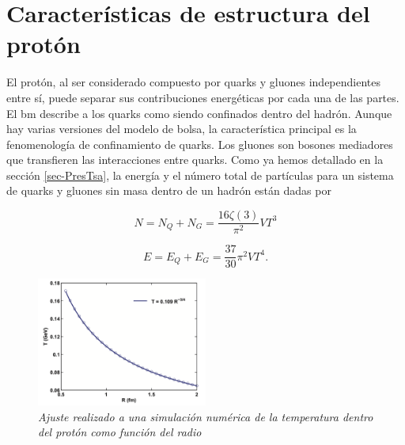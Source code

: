 \chapter{Características de estructura del protón}\label{ch-ProtonStructureCh}

\fancyhf{} %
\fancyhead[LE]{\nouppercase{\textbf{\leftmark}\hfill\textit{\rightmark}}}
\fancyhead[RO]{\nouppercase{\textit{\rightmark}\hfill\textbf{\leftmark}}}

El protón, al ser considerado compuesto por quarks y gluones independientes entre sí, puede separar sus contribuciones energéticas por cada una de las partes. El \acrshort{bm} describe a los quarks como siendo confinados dentro del hadrón. Aunque hay varias versiones del modelo de bolsa, la característica principal es la fenomenología de confinamiento de quarks. Los gluones son bosones mediadores que transfieren las interacciones entre quarks. Como ya hemos detallado en la sección \ref{sec-PresTsa}, la energía y el número total de partículas para un sistema de quarks y gluones sin masa dentro de un hadrón están dadas por

\begin{equation}
N ={N}_{Q} + {N}_{G}  = \frac{16 \zeta(3)}{{\pi}^{2}}V{T}^{3}
\end{equation}

\begin{equation}
E = {E}_{Q} + {E}_{G} = \frac{37}{30} {\pi}^{2} V{T}^{4}.
\end{equation}


\begin{figure}
\centering
\includegraphics[width=0.5\textwidth]{./Images/T(R).png}
\caption[Temperatura como función del radio del protón]{\emph{Ajuste realizado a una simulación numérica de la temperatura dentro del protón como función del radio}}
\label{fig: T(r)}
\end{figure}

